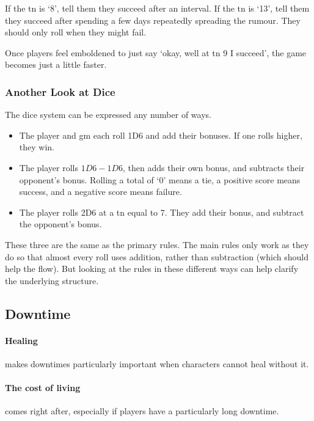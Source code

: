 \begin{multicols}{2}
If the \gls{tn} is `8', tell them they succeed after an interval.
If the \gls{tn} is `13', tell them they succeed after spending a few days repeatedly spreading the rumour.
They should only roll when they might fail.

Once players feel emboldened to just say `okay, well at \gls{tn} 9 I succeed', the game becomes just a little faster.

\subsubsection{Another Look at Dice}

The dice system can be expressed any number of ways.

\begin{itemize}

  \item
  The player and \gls{gm} each roll 1D6 and add their bonuses.
  If one rolls higher, they win.
  \item
  The player rolls $1D6-1D6$, then adds their own bonus, and subtracts their opponent's bonus.
  Rolling a total of `0' means a tie, a positive score means success, and a negative score means failure.
  \item
  The player rolls 2D6 at a \gls{tn} equal to 7.
  They add their bonus, and subtract the opponent's bonus.

\end{itemize}

These three are the same as the primary rules.
The main rules only work as they do so that almost every roll uses addition, rather than subtraction (which should help the flow).
But looking at the rules in these different ways can help clarify the underlying structure.

\subsection{Downtime}

\paragraph{Healing}
makes downtimes particularly important when characters cannot heal without it.

\paragraph{The cost of living}
comes right after, especially if players have a particularly long downtime.


\end{multicols}

